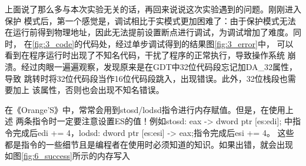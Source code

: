 \documentclass[12pt,a4paper,UTF8]{ctexart}
\begin{document}
上面说了那么多与本次实验无关的话，再回来说说这次实验遇到的问题。刚刚进入保护
模式后，第一个感觉是，调试相比于实模式更加困难了：由于保护模式无法
在运行前得到物理地址，因此无法提前设置断点进行调试，为调试增加了难度。同时，
在\ref{fig:3_code}的代码处，经过单步调试得到的结果图\ref{fig:3_error}中，
可以看到在程序运行时出现了不知名代码，干扰了程序的正常执行，导致操作系统
崩溃。经过肉眼一遍遍观察，发现原来是在GDT中32位代码段忘记加DA\_32属性，导致
跳转时将32位代码段当作16位代码段跳入，出现错误。此外，32位栈段也需要加上
该属性，否则也会出现不知名错误。

\begin{figure}[htbp]
\centering
{}
\end{figure}

在《Orange'S》中，常常会用到stosd/lodsd指令进行内存赋值。但是，在使用上述
两条指令时一定要注意设置ES的值！例如stosd: eax -> dword  ptr [es:edi];
中指令完成后edi += 4，lodsd: dword ptr [es:esi] -> eax;指令完成后esi += 4。
这些都是指令的一些细节且是编程者在使用时必须知道的知识。如果出错，就会出现
如图\ref{fig:6_success}所示的内存写入
\end{document}
